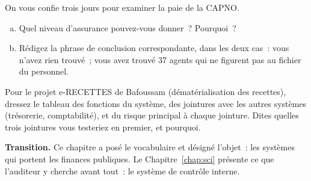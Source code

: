 \begin{boxexo}[title={\ding{45}\quad Exercice~1.3. Choisir l'assurance \niveaumoyen}]
On vous confie trois jours pour examiner la paie de la CAPNO.
\begin{enumerate}[(a)]
    \item Quel niveau d'assurance pouvez-vous donner~? Pourquoi~?
    \item Rédigez la phrase de conclusion correspondante, dans les deux
          cas~: vous n'avez rien trouvé~; vous avez trouvé 37 agents qui
          ne figurent pas au fichier du personnel.
\end{enumerate}
\end{boxexo}

\begin{boxexo}[title={\ding{45}\quad Exercice~1.4. Cartographier \niveauexpert}]
Pour le projet e-RECETTES de Bafoussam (dématérialisation des recettes),
dressez le tableau des fonctions du système, des jointures avec les
autres systèmes (trésorerie, comptabilité), et du risque principal à
chaque jointure. Dites quelles trois jointures vous testeriez en premier,
et pourquoi.
\end{boxexo}

\begin{boxinfo}
\textbf{Transition.} Ce chapitre a posé le vocabulaire et désigné
l'objet~: les systèmes qui portent les finances publiques. Le
Chapitre~\ref{chap:sci} présente ce que l'auditeur y cherche avant
tout~: le système de contrôle interne.
\end{boxinfo}
